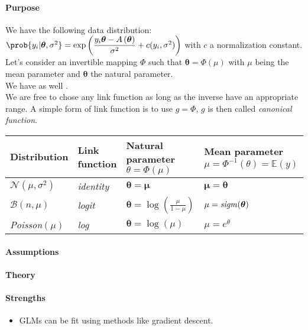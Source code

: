 \paragraph{Purpose}
We have the following data distribution:
$\prob{y_{i}|\bm{\theta},\sigma^{2}} = \exp\left(\dfrac{y_{i}\bm{\theta} - A\left(
\bm{\theta}\right)}{\sigma^{2}} + c(y_{i}, \sigma^{2})
\right)$
with $c$ a normalization constant.\\
Let's consider an invertible mapping $\Phi$ such that $\bm{\theta} = \Phi(\mu)$ with
$\mu$ being the mean parameter and $\bm{\theta}$ the natural parameter.\\
We have as well .\\
We are free to chose any link function as long as the inverse have an appropriate 
range. A simple form of link function is to use $g=\Phi$, $g$ is then called 
\emph{canonical function}.

\begin{center}
    \begin{tabular}{|*{4}{l|}}
    \hline
    \textbf{Distribution} & \textbf{Link function}  & 
    \textbf{Natural parameter} $\theta = \Phi(\mu)$ & \textbf{Mean parameter} $\mu = 
    \Phi^{-1}(\theta) = \mathbb{E}(y)$ \\
    \hline
    $\mathcal{N}(\mu, \sigma^{2})$ & \emph{identity} & $\bm{\theta} = \bm{\mu}$ & 
    $\bm{\mu} = \bm{\theta}$\\
    \hline
    $\mathcal{B}(n,\mu)$ & \emph{logit} & $\bm{\theta} = \log\left(\frac{\mu}{1-\mu}
    \right)$ & $\mu = \text{\emph{sigm}}(\bm{\theta})$\\
    \hline
    \emph{Poisson}$(\mu)$ & \emph{log} & $\bm{\theta} = \log\left(\mu\right)$ & 
    $\mu=e^{\theta}$\\
    \hline
    \end{tabular}
\end{center}

\paragraph{Assumptions}
\paragraph{Theory}
\paragraph{Strengths}
\begin{itemize}
    \item GLMs can be fit using methods like gradient descent.
\end{itemize}

